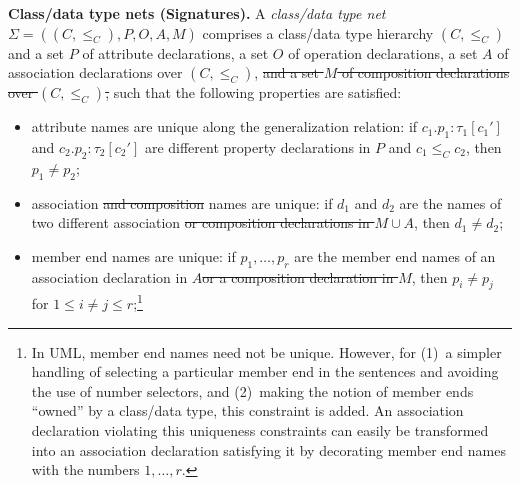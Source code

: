 \documentclass[10pt,fleqn,final]{scrreprt}
\providecommand{\DIFadd}[1]{{\protect\color{blue}\uwave{#1}}} %
\providecommand{\DIFdel}[1]{{\protect\color{red}\sout{#1}}}                      %
\providecommand{\DIFaddbegin}{} %
\providecommand{\DIFaddend}{} %
\providecommand{\DIFdelbegin}{} %
\providecommand{\DIFdelend}{} %
\begin{document}
\medskip\noindent\textbf{Class/data type nets (Signatures).}
A \emph{class/data type net} \DIFdelbegin \DIFdel{$\Sigma = ((C, {\leq_C}), P, O, A, M)$
}\DIFdelend \DIFaddbegin \DIFadd{$\Sigma = ((C, {\leq_C}), P, O, A)$
}\DIFaddend comprises a class/data type hierarchy $(C, {\leq_C})$ and a set $P$ of
attribute declarations, a set $O$ of operation declarations,
 \DIFaddbegin \DIFadd{and }\DIFaddend a set $A$ of association declarations over
$(C, {\leq_C})$, \DIFdelbegin \DIFdel{and a set $M$ of composition declarations over $(C, {\leq_C})$, }\DIFdelend such that
the following properties are satisfied:
%
\begin{itemize}[label={--}, leftmargin=*]
  \item attribute names are unique along the generalization relation: if
$c_1.p_1 : \tau_1[c_1']$ and $c_2.p_2 : \tau_2[c_2']$ are different
property declarations in $P$ and $c_1 \leq_C c_2$, then $p_1 \neq
p_2$;

  \item association \DIFdelbegin \DIFdel{and composition }\DIFdelend names are unique: if $d_1$
and $d_2$
are the names of two different association \DIFdelbegin \DIFdel{or composition
declarations in $M \cup A$}\DIFdelend \DIFaddbegin \DIFadd{declarations in $A$}\DIFaddend ,
then $d_1 \neq d_2$;

  \item member end names are unique: if $p_1, \ldots, p_r$
are the member end names of an association declaration in $A$\DIFdelbegin \DIFdel{or a composition
declaration in $M$}\DIFdelend ,
then $p_i \neq p_j$
for $1 \leq i \neq j \leq r$;\footnote{In
  UML, member end names need not be unique.  However, for (1)~a simpler
  handling of selecting a particular member end in the sentences and
  avoiding the use of number selectors, and (2)~making the notion of
  member ends ``owned'' by a class/data type, this constraint is
  added. An association declaration violating this uniqueness
  constraints can easily be transformed into an association declaration
  satisfying it by decorating member end names with the numbers
  \DIFdelbegin \DIFdel{$1,\ldots,r$}\DIFdelend \DIFaddbegin \DIFadd{$1, \ldots, r$}\DIFaddend .}


\end{itemize}
\end{document}
